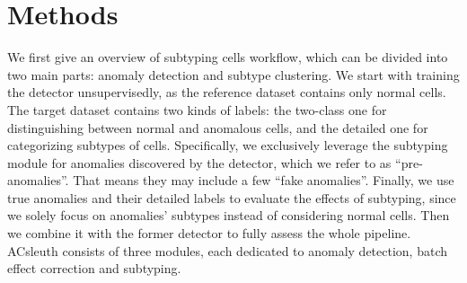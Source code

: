 \documentclass{article}
\begin{document}
\section{Methods}
We first give an overview of subtyping cells workflow, which can be divided into two main 
parts: anomaly detection and subtype clustering. We start with training the detector 
unsupervisedly, as the reference dataset contains only normal cells. The target dataset 
contains two kinds of labels: the two-class one for distinguishing between normal and 
anomalous cells, and the detailed one for categorizing subtypes of cells. Specifically, 
we exclusively leverage the subtyping module for anomalies discovered by the detector, 
which we refer to as “pre-anomalies”. That means they may include a few “fake anomalies”. 
Finally, we use true anomalies and their detailed labels to evaluate the effects of 
subtyping, since we solely focus on anomalies’ subtypes instead of considering normal 
cells. Then we combine it with the former detector to fully assess the whole pipeline. 
ACsleuth consists of three modules, each dedicated to anomaly detection, batch effect correction and subtyping.
\end{document}
